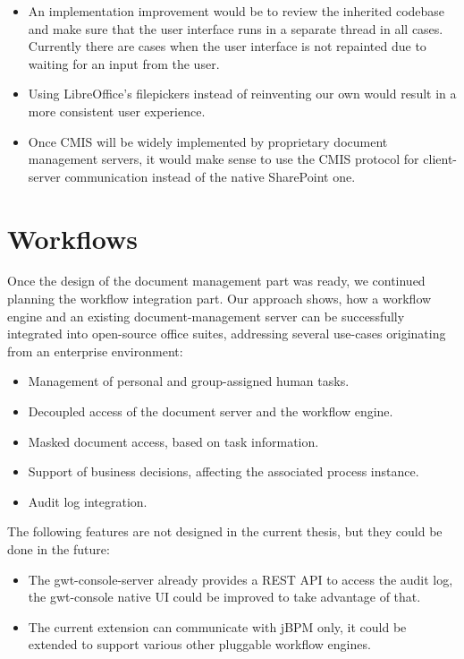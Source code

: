 \begin{itemize}
\item An implementation improvement would be to review the inherited codebase
and make sure that the user interface runs in a separate thread in all cases.
Currently there are cases when the user interface is not repainted due to
waiting for an input from the user.
\item Using LibreOffice's filepickers instead of reinventing our own would
result in a more consistent user experience.
\item Once CMIS will be widely implemented by proprietary document management
servers, it would make sense to use the CMIS protocol for client-server
communication instead of the native SharePoint one.
\end{itemize}

\section{Workflows}

Once the design of the document management part was ready, we continued
planning the workflow integration part. Our approach shows, how a workflow
engine and an existing document-management server can be successfully
integrated into open-source office suites, addressing several use-cases
originating from an enterprise environment:

\begin{itemize}
\item Management of personal and group-assigned human tasks.
\item Decoupled access of the document server and the workflow engine.
\item Masked document access, based on task information.
\item Support of business decisions, affecting the associated process instance.
\item Audit log integration.
\end{itemize}

The following features are not designed in the current thesis, but they could
be done in the future:

\begin{itemize}
\item The gwt-console-server already provides a REST API to access the audit log,
the gwt-console native UI could be improved to take advantage of that.
\item The current extension can communicate with jBPM only, it could be
extended to support various other pluggable workflow engines.
\end{itemize}

